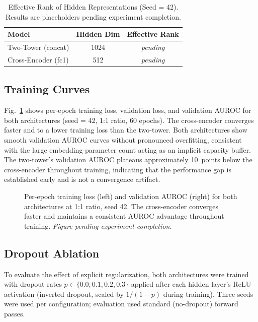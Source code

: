 \documentclass[journal]{IEEEtran}
\begin{document}
\begin{table}[!t]
  \caption{Effective Rank of Hidden Representations (Seed = 42).
    Results are placeholders pending experiment completion.}
  \label{tab:effective_rank}
  \centering
  \footnotesize
  \begin{tabular}{@{}lcc@{}}
    \hline
    Model & Hidden Dim & Effective Rank \\
    \hline
    Two-Tower (concat)    & 1024 & \textit{pending} \\
    Cross-Encoder (fc1)   & 512  & \textit{pending} \\
    \hline
  \end{tabular}
\end{table}

\subsection{Training Curves}
\label{ssec:training_curves}

Fig.~\ref{fig:training_curves} shows per-epoch training loss, validation loss,
and validation AUROC for both architectures (seed = 42, 1:1 ratio, 60 epochs).
The cross-encoder converges faster and to a lower training loss than the
two-tower. Both architectures show smooth validation AUROC curves without
pronounced overfitting, consistent with the large embedding-parameter count
acting as an implicit capacity buffer. The two-tower's validation AUROC
plateaus approximately 10~points below the cross-encoder throughout training,
indicating that the performance gap is established early and is not a
convergence artifact.

\begin{figure}[!t]
  \centering
  \caption{Per-epoch training loss (left) and validation AUROC (right) for
    both architectures at 1:1 ratio, seed 42. The cross-encoder converges
    faster and maintains a consistent AUROC advantage throughout training.
    \textit{Figure pending experiment completion.}}
  \label{fig:training_curves}
\end{figure}

\subsection{Dropout Ablation}
\label{ssec:dropout}

To evaluate the effect of explicit regularization, both architectures were
trained with dropout rates $p \in \{0.0, 0.1, 0.2, 0.3\}$ applied after
each hidden layer's ReLU activation (inverted dropout, scaled by $1/(1-p)$
during training). Three seeds were used per configuration; evaluation used
standard (no-dropout) forward passes.
\end{document}
